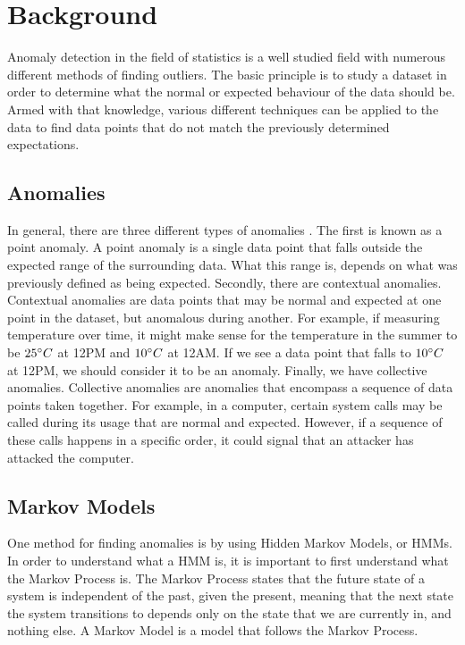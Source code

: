 \documentclass[letterpaper, 11pt]{article}%
\begin{document}
\section{Background}
Anomaly detection in the field of statistics is a well studied field with numerous different methods of finding outliers. The basic principle is to study a dataset in order to determine what the normal or expected behaviour of the data should be. Armed with that knowledge, various different techniques can be applied to the data to find data points that do not match the previously determined expectations. 
	
\subsection{Anomalies}
In general, there are three different types of anomalies \cite{zahra}. The first is known as a point anomaly. A point anomaly is a single data point that falls outside the expected range of the surrounding data. What this range is, depends on what was previously defined as being expected. Secondly, there are contextual anomalies. Contextual anomalies are data points that may be normal and expected at one point in the dataset, but anomalous during another. For example, if measuring temperature over time, it might make sense for the temperature in the summer to be $25 \degree C$ at 12PM and $10 \degree C$ at 12AM. If we see a data point that falls to $10 \degree C$ at 12PM, we should consider it to be an anomaly. Finally, we have collective anomalies. Collective anomalies are anomalies that encompass a sequence of data points taken together. For example, in a computer, certain system calls may be called during its usage that are normal and expected. However, if a sequence of these calls happens in a specific order, it could signal that an attacker has attacked the computer\cite{chandola}. 
	
\subsection{Markov Models}
One method for finding anomalies is by using Hidden Markov Models, or HMMs. In order to understand what a HMM is, it is important to first understand what the Markov Process is. The Markov Process states that the future state of a system is independent of the past, given the present, meaning that the next state the system transitions to depends only on the state that we are currently in, and nothing else. A Markov Model is a model that follows the Markov Process. 
\end{document}
